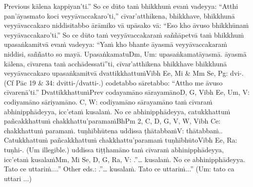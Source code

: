 {{{		\hypertarget{endnote-appendix}{\hyperlink{endnote-body}{}}}}}\makeatother Previous kālena kappiyan'ti.'' So ce dūto taṁ bhikkhuṁ evaṁ vadeyya: ``Atthi pan'āyasmato koci veyyāvaccakaro'ti,'' cīvar'atthikena, bhikkhave, bhikkhunā veyyāvaccakaro niddisitabbo ārāmiko vā upāsako vā: ``Eso kho āvuso bhikkhūnaṁ veyyāvaccakaro'ti.'' So ce dūto taṁ veyyāvaccakaraṁ saññāpetvā taṁ bhikkhuṁ upasaṅkamitvā evaṁ vadeyya: ``Yaṁ kho bhante āyasmā veyyāvaccakaraṁ niddisi, saññatto so mayā. Upasaṅkamatu\makeatletter\hyperlink{endnote-appendix}\makeatother Dm, Um: upasaṅkamatāyasmā. āyasmā kālena, cīvarena taṁ acchādessatī''ti, cīvar'atthikena bhikkhave bhikkhunā veyyāvaccakaro upasaṅkamitvā dvattikkhattuṁ\makeatletter\hyperlink{endnote-appendix}\makeatother Vibh Ee, Mi & Mm Se, Pg: dvi-. (Cf Pāc 19 & 34: dvitti-/dvatti-.) codetabbo sāretabbo: ``Attho me āvuso cīvarenā'ti.'' Dvattikkhattuṁ\makeatletter\hyperlink{endnote-appendix}\makeatother Prev codayamāno sārayamāno\makeatletter\hyperlink{endnote-appendix}\makeatother D, G, Vibh Ee, Um, V: codiyamāno sāriyamāno. C, W: codiyamāno sārayamāno taṁ cīvaraṁ abhinipphādeyya, icc'etaṁ kusalaṁ. No ce abhinipphādeyya, catukkhattuṁ pañcakkhattuṁ chakkhattu'paramaṁ\makeatletter\hyperlink{endnote-appendix}\makeatother \makeatletter\hyperlink{endnote-appendix}\makeatother BhPm 2, C, D, G, V, W, Vibh Ce: chakkhattuṁ paramaṁ.  tuṇhībhūtena uddissa ṭhātabbaṁ\makeatletter\hyperlink{endnote-appendix}\makeatother V: thātabbaṁ.. Catukkhattuṁ pañcakkhattuṁ chakkhattu'paramaṁ tuṇhībhūto\makeatletter\hyperlink{endnote-appendix}\makeatother  Vibh Ee, Ra: tuṇhi-. (Um illegible.) uddissa tiṭṭhamāno taṁ cīvaraṁ abhinipphādeyya, icc'etaṁ kusalaṁ\makeatletter\hyperlink{endnote-appendix}\makeatother Mm, Mi Se, D, G, Ra, V: .”… kusalaṁ. No ce abhinipphādeyya. Tato ce uttariṁ....” Other eds.: .”… kusalaṁ. Tato ce uttariṁ...” (Um: tato ca uttari ...)
